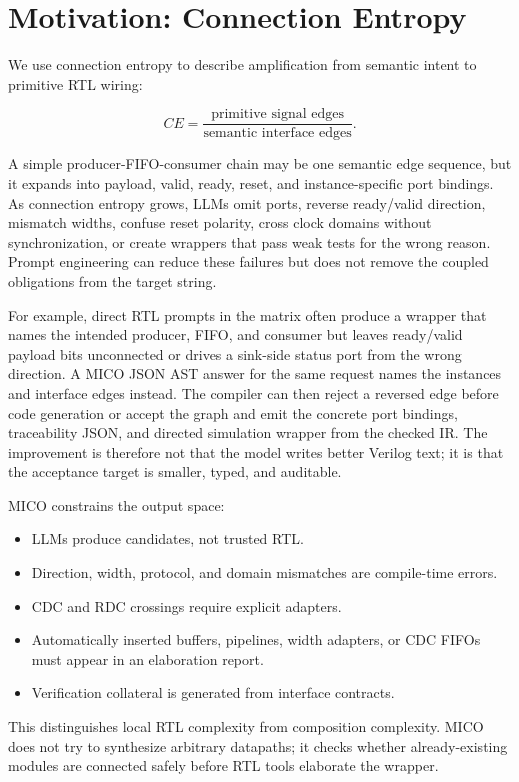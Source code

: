\section{Motivation: Connection Entropy}

We use connection entropy to describe amplification from semantic intent to primitive RTL wiring:

\begin{equation}
  CE = \frac{\text{primitive signal edges}}{\text{semantic interface edges}}.
\end{equation}

A simple producer-FIFO-consumer chain may be one semantic edge sequence, but it expands into payload, valid, ready, reset, and instance-specific port bindings. As connection entropy grows, LLMs omit ports, reverse ready/valid direction, mismatch widths, confuse reset polarity, cross clock domains without synchronization, or create wrappers that pass weak tests for the wrong reason. Prompt engineering can reduce these failures but does not remove the coupled obligations from the target string.

For example, direct RTL prompts in the matrix often produce a wrapper that names
the intended producer, FIFO, and consumer but leaves ready/valid payload bits
unconnected or drives a sink-side status port from the wrong direction. A MICO
JSON AST answer for the same request names the instances and interface edges
instead. The compiler can then reject a reversed edge before code generation or
accept the graph and emit the concrete port bindings, traceability JSON, and
directed simulation wrapper from the checked IR. The improvement is therefore
not that the model writes better Verilog text; it is that the acceptance target
is smaller, typed, and auditable.

MICO constrains the output space:

\begin{itemize}
  \item LLMs produce candidates, not trusted RTL.
  \item Direction, width, protocol, and domain mismatches are compile-time errors.
  \item CDC and RDC crossings require explicit adapters.
  \item Automatically inserted buffers, pipelines, width adapters, or CDC FIFOs must appear in an elaboration report.
  \item Verification collateral is generated from interface contracts.
\end{itemize}

This distinguishes local RTL complexity from composition complexity. MICO does not try to synthesize arbitrary datapaths; it checks whether already-existing modules are connected safely before RTL tools elaborate the wrapper.
